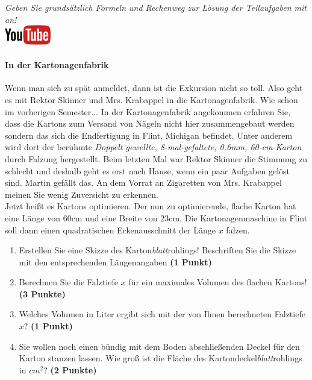 \documentclass[a4paper, 9pt]{scrartcl}\usepackage[]{graphicx}\usepackage[]{xcolor}
\begin{document}
\textit{Geben Sie grunds{\"a}tzlich Formeln und Rechenweg zur L{\"o}sung der
  Teilaufgaben mit an!} \\[1Ex]

\hfill\href{https://youtu.be/RuzMjwvwT-4}{\includegraphics[width =
  2cm]{img/youtube}} %
\hspace{2Ex}

\paragraph{In der Kartonagenfabrik}



Wenn man sich zu sp{\"a}t anmeldet, dann ist die Exkursion nicht so toll. Also
geht es mit Rektor Skinner und Mrs. Krabappel in die Kartonagenfabrik. Wie
schon im vorherigen Semester... In der Kartonagenfabrik angekommen erfahren
Sie, dass die Kartons zum Versand von N{\"a}geln nicht hier zusammengebaut
werden sondern das sich die Endfertigung in Flint, Michigan befindet. Unter
anderem wird dort der ber{\"u}hmte \textit{Doppelt gewellte,
  8-mal-gefaltete, 0.6mm, 60-cm-Karton} durch
Falzung hergestellt. Beim letzten Mal war Rektor Skinner die Stimmung zu
schlecht und deshalb geht es erst nach Hause, wenn ein paar Aufgaben gel{\"o}st
sind. Martin gef{\"a}llt das. An dem Vorrat
an Zigaretten von Mrs. Krabappel meinen Sie wenig Zuversicht zu erkennen.\\

Jetzt hei{\ss}t es Kartons optimieren. Der nun zu optimierende, flache Karton
hat eine L{\"a}nge von 60cm und eine Breite von 23cm. Die
Kartonagenmaschine in Flint soll dann einen quadratischen Eckenausschnitt
der L{\"a}nge $x$ falzen.

\begin{enumerate}
\item Erstellen Sie eine Skizze des Karton\textit{blatt}rohlings!
  Beschriften Sie die Skizze mit den entsprechenden L{\"a}ngenangaben
  \textbf{(1 Punkt)}
\item Berechnen Sie die Falztiefe $x$ f{\"u}r ein maximales Volumen des flachen
  Kartons! \textbf{(3 Punkte)}
\item Welches Volumen in Liter ergibt sich mit der von Ihnen berechneten
  Falztiefe $x$?  \textbf{(1 Punkt)}
\item Sie wollen noch einen b{\"u}ndig mit dem Boden abschlie{\ss}enden Deckel f{\"u}r
  den Karton stanzen lassen. Wie gro{\ss} ist die Fl{\"a}che des
  Kartondeckel\textit{blatt}rohlings in $cm^2$? \textbf{(2 Punkte)}
\end{enumerate}
\end{document}
